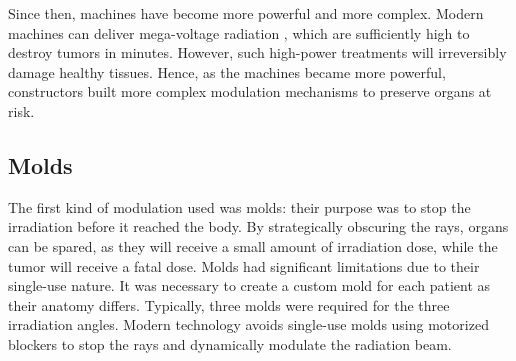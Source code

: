 Since then, machines have become more powerful and more complex.
Modern machines can deliver mega-voltage radiation \cite{Huh2020}, which are sufficiently high to destroy tumors in minutes.
However, such high-power treatments will irreversibly damage healthy tissues.
Hence, as the machines became more powerful, constructors built more complex modulation mechanisms to preserve organs at risk.

\subsection{Molds}
The first kind of modulation used was molds: their purpose was to stop the irradiation before it reached the body.
By strategically obscuring the rays, organs can be spared, as they will receive a small amount of irradiation dose, while the tumor will receive a fatal dose.
Molds had significant limitations due to their single-use nature.
It was necessary to create a custom mold for each patient as their anatomy differs.
Typically, three molds were required for the three irradiation angles.
Modern technology avoids single-use molds using motorized blockers to stop the rays and dynamically modulate the radiation beam.


